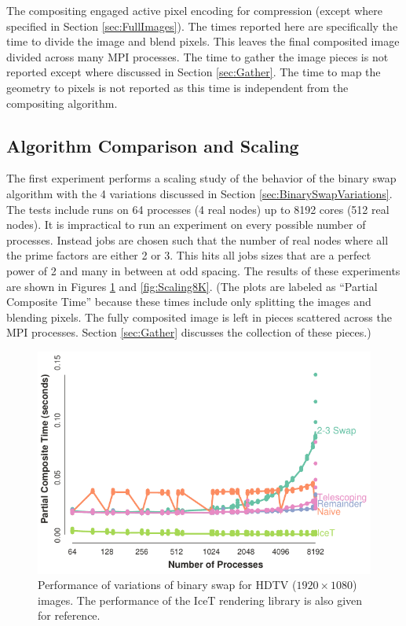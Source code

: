 \documentclass{vgtc}                          %
\newcommand{\textalgorithm}[1]{\textsf{#1}\xspace}
\newcommand{\binaryswap}{\textalgorithm{binary swap}}
\begin{document}
The compositing engaged active pixel encoding for compression (except where specified in Section \ref{sec:FullImages}).
The times reported here are specifically the time to divide the image and blend pixels.
This leaves the final composited image divided across many MPI processes.
The time to gather the image pieces is not reported except where discussed in Section \ref{sec:Gather}.
The time to map the geometry to pixels is not reported as this time is independent from the compositing algorithm.

\subsection{Algorithm Comparison and Scaling}
\label{sec:Scaling}

The first experiment performs a scaling study of the behavior of the \binaryswap algorithm with the 4 variations discussed in Section \ref{sec:BinarySwapVariations}.
The tests include runs on 64 processes (4 real nodes) up to 8192 cores (512 real nodes).
It is impractical to run an experiment on every possible number of processes.
Instead jobs are chosen such that the number of real nodes where all the prime factors are either 2 or 3.
This hits all jobs sizes that are a perfect power of 2 and many in between at odd spacing.
The results of these experiments are shown in Figures \ref{fig:ScalingHDTV} and \ref{fig:Scaling8K}.
(The plots are labeled as ``Partial Composite Time'' because these times include only splitting the images and blending pixels.
The fully composited image is left in pieces scattered across the MPI processes.
Section \ref{sec:Gather} discusses the collection of these pieces.)

\begin{figure}
  \centering
  \includegraphics[width=\linewidth]{scaling-hdtv}
  \caption{
    Performance of variations of \binaryswap for HDTV ($1920 \times 1080$) images.
    The performance of the IceT rendering library is also given for reference.
  }
  \label{fig:ScalingHDTV}
\end{figure}
\end{document}
